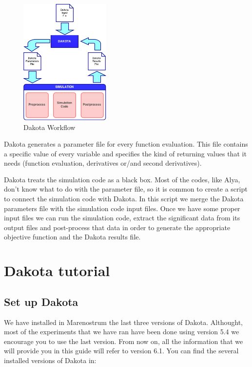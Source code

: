 \documentclass[12pt,a4paper,article]{memoir}
\begin{document}
\begin{figure}[htb!]
  \centering
    \includegraphics[width=0.4\textwidth]{DakotaWorkflow}
  \caption{Dakota Workflow}
  \label{fig:Workflow}
\end{figure}

Dakota generates a parameter file for every function evaluation. This file contains a specific value of every variable and specifies the kind of returning values that it needs (function evaluation, derivatives or/and second derivatives).

Dakota treats the simulation code as a black box. Most of the codes, like Alya, don't know what to do with the parameter file, so it is common to create a script to connect the simulation code with Dakota. In this script we merge the Dakota parameters file with the simulation code input files. Once we have some proper input files we can run the simulation code, extract the significant data from its output files and post-process that data in order to generate the appropriate objective function and the Dakota results file.

\chapter{Dakota tutorial}
\section{Set up Dakota}

We have installed in Marenostrum the last three versions of Dakota. Althought, most of the experiments that we have ran have been done using version 5.4 we encourage you to use the last version. From now on, all the information that we will provide you in this guide will refer to version 6.1. You can find the several installed versions of Dakota in:
\end{document}

